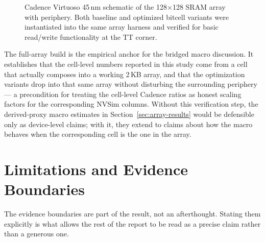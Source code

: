 \documentclass[pdflatex,sn-mathphys-num]{sn-jnl}%
\theoremstyle{thmstyleone}%
\theoremstyle{thmstyletwo}%
\theoremstyle{thmstylethree}%
\begin{document}
\begin{figure}[h]
\centering
{}
\caption{Cadence Virtuoso 45\,nm schematic of the 128$\times$128 SRAM array with periphery. Both baseline and optimized bitcell variants were instantiated into the same array harness and verified for basic read/write functionality at the TT corner.}\label{fig:cadence-array}
\end{figure}

The full-array build is the empirical anchor for the bridged macro discussion. It establishes that the cell-level numbers reported in this study come from a cell that actually composes into a working 2\,KB array, and that the optimization variants drop into that same array without disturbing the surrounding periphery — a precondition for treating the cell-level Cadence ratios as honest scaling factors for the corresponding NVSim columns. Without this verification step, the derived-proxy macro estimates in Section~\ref{sec:array-results} would be defensible only as device-level claims; with it, they extend to claims about how the macro behaves when the corresponding cell is the one in the array.

\section{Limitations and Evidence Boundaries}\label{sec:limitations}

The evidence boundaries are part of the result, not an afterthought. Stating them explicitly is what allows the rest of the report to be read as a precise claim rather than a generous one.
\end{document}
